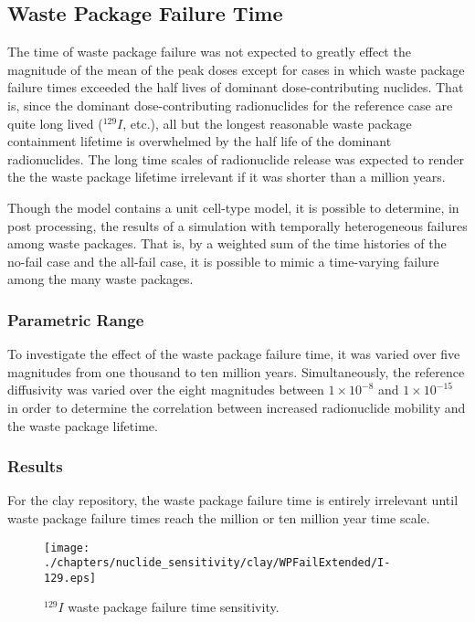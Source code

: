
\subsection{Waste Package Failure Time}

The time of waste package failure was not expected to greatly effect the 
magnitude of the mean of the peak doses except for cases in which waste package failure times 
exceeded the half lives of dominant dose-contributing nuclides. 
That is, since the dominant dose-contributing 
radionuclides for the reference case are quite long lived ($^{129}I$, etc.), 
all but the longest reasonable waste package containment lifetime is overwhelmed by 
the half life of the dominant radionuclides. The long time scales of 
radionuclide release was expected to render the the waste package lifetime 
irrelevant if it was shorter than a million years. 

Though the model contains a unit cell-type model, it is possible to determine, 
in post processing, the results of a simulation with temporally heterogeneous 
failures among waste packages. That is, by a weighted sum of the time histories 
of the no-fail case and the all-fail case, it is possible to mimic a 
time-varying failure among the many waste packages. 

\subsubsection{Parametric Range}

To investigate the effect of the waste package failure time, it was varied over 
five magnitudes from one thousand to ten million years. Simultaneously, the reference 
diffusivity was varied over the eight magnitudes between $1\times10^{-8}$ and 
$1\times10^{-15}$ in order to determine the correlation between increased 
radionuclide mobility and the waste package lifetime. 

\subsubsection{Results}

For the clay repository, the waste package failure time is entirely irrelevant 
until waste package failure times reach the million or ten million year time 
scale. 

\begin{figure}[ht!]
\centering
\texttt{[image: ./chapters/nuclide\_sensitivity/clay/WPFailExtended/I-129.eps]}
\caption{$^{129}I$ waste package failure time sensitivity. }
\label{fig:WPFailI129}
\end{figure}

